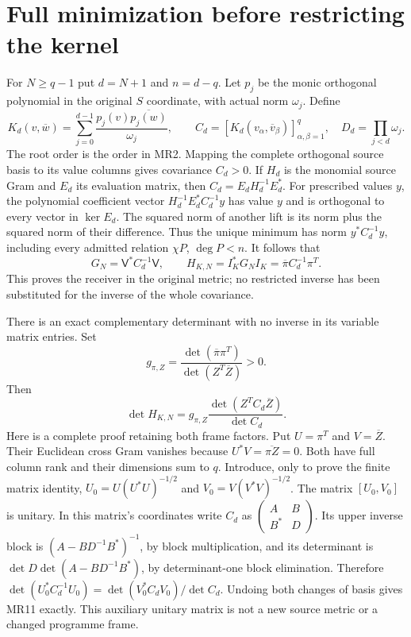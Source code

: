 \section{Full minimization before restricting the kernel}
For $N\ge q-1$ put $d=N+1$ and $n=d-q$. Let $p_j$ be the monic
orthogonal polynomial in the original $S$ coordinate, with actual norm
$\omega_j$. Define
\[
 K_d(v,\overline w)=\sum_{j=0}^{d-1}
       \frac{p_j(v)\overline{p_j(w)}}{\omega_j},
 \qquad C_d=[K_d(v_\alpha,\overline v_\beta)]_{\alpha,\beta=1}^q,
 \quad D_d=\prod_{j<d}\omega_j.\tag{MR9}
\]
The root order is the order in MR2. Mapping the complete orthogonal
source basis to its value columns gives covariance $C_d>0$.
If $H_d$ is the monomial source Gram and $E_d$ its evaluation matrix,
then $C_d=E_dH_d^{-1}E_d^*$. For prescribed values $y$, the polynomial
coefficient vector $H_d^{-1}E_d^*C_d^{-1}y$ has value $y$ and is
orthogonal to every vector in $\ker E_d$. The squared norm of another
lift is its norm plus the squared norm of their difference. Thus the
unique minimum has norm $y^*C_d^{-1}y$, including every admitted
relation $\chi P$, $\deg P<n$. It follows that
\[
 G_N=\mathsf V^*C_d^{-1}\mathsf V,
 \qquad H_{K,N}=I_K^*G_NI_K
           =\overline\pi C_d^{-1}\pi^T.\tag{MR10}
\]
This proves the receiver in the original metric; no restricted inverse
has been substituted for the inverse of the whole covariance.

There is an exact complementary determinant with no inverse in its
variable matrix entries. Set
\[
 g_{\pi,Z}=
 \frac{\det(\overline\pi\pi^T)}{\det(Z^T\overline Z)}>0.
\]
Then
\[
 \boxed{\det H_{K,N}
     =g_{\pi,Z}\frac{\det(Z^TC_d\overline Z)}{\det C_d}.}
 \tag{MR11}
\]
Here is a complete proof retaining both frame factors. Put
$U=\pi^T$ and $V=\overline Z$. Their Euclidean cross Gram vanishes
because $U^*V=\overline{\pi Z}=0$. Both have full column rank and
their dimensions sum to $q$. Introduce, only to prove the finite
matrix identity, $U_0=U(U^*U)^{-1/2}$ and
$V_0=V(V^*V)^{-1/2}$. The matrix $[U_0,V_0]$ is unitary.
In this matrix's coordinates write $C_d$ as
$\left(\begin{smallmatrix}A&B\\B^*&D\end{smallmatrix}\right)$.
Its upper inverse block is $(A-BD^{-1}B^*)^{-1}$, by block
multiplication, and its determinant is
$\det D\det(A-BD^{-1}B^*)$, by determinant-one block elimination.
Therefore $\det(U_0^*C_d^{-1}U_0)=\det(V_0^*C_dV_0)/\det C_d$.
Undoing both changes of basis gives MR11 exactly. This auxiliary
unitary matrix is not a new source metric or a changed programme frame.

